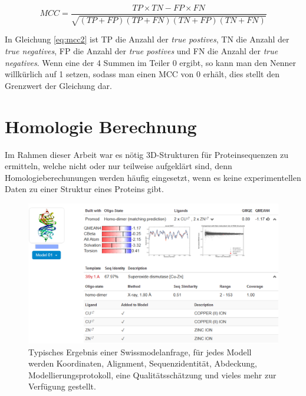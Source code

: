 \begin{equation}
    MCC = \frac{TP \times TN - FP \times FN}{\sqrt{(TP + FP)(TP + FN)(TN + FP)(TN + FN)}}
    \label{eq:mcc2}
\end{equation}

In Gleichung \ref{eq:mcc2} ist TP die Anzahl der \emph{true postives}, TN die Anzahl der \emph{true negatives}, FP die Anzahl der \emph{true postives} und FN die Anzahl der \emph{true negatives}. Wenn eine der 4 Summen im Teiler 0 ergibt, so kann man den Nenner willkürlich auf 1 setzen, sodass man einen MCC von 0 erhält, dies stellt den Grenzwert der Gleichung dar.


\section{Homologie Berechnung}
\label{sec:siwssmodel}
Im Rahmen dieser Arbeit war es nötig 3D-Strukturen für Proteinsequenzen zu ermitteln, welche nicht oder nur teilweise aufgeklärt sind, denn Homologieberechunungen werden häufig eingesetzt, wenn es keine experimentellen Daten zu einer Struktur eines Proteins gibt. 
\begin{figure}[H]
    \includegraphics[width=.95\textwidth]{images/Swissmodel.png}
    \caption{Typisches Ergebnis einer Swissmodelanfrage, für jedes Modell werden Koordinaten, Alignment, Sequenzidentität, Abdeckung, Modellierungsprotokoll, eine Qualitätsschätzung und vieles mehr zur Verfügung gestellt.}
    \label{fig:swissmodel}
\end{figure}


